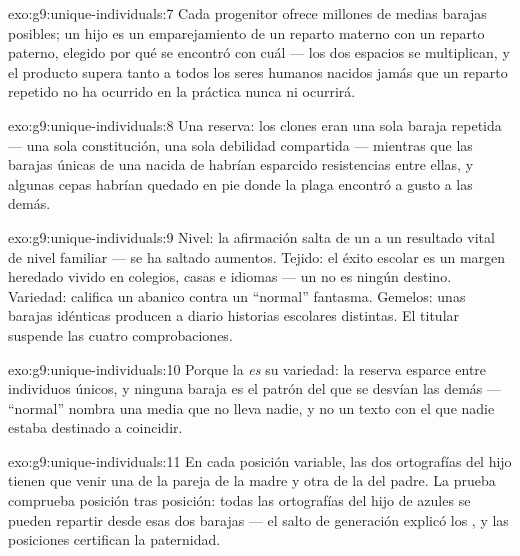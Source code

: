 \begin{solution}{exo:g9:unique-individuals:7}
Cada progenitor ofrece millones de medias barajas posibles; un hijo es
un emparejamiento de un reparto materno con un reparto paterno,
elegido por qué  se encontró con cuál --- los dos espacios se
multiplican, y el producto supera tanto a todos los seres humanos
nacidos jamás que un reparto repetido no ha ocurrido en la práctica
nunca ni ocurrirá.
\end{solution}

\begin{solution}{exo:g9:unique-individuals:8}
Una reserva: los clones eran una sola baraja repetida --- una sola
constitución, una sola debilidad compartida --- mientras que las
barajas únicas de una  nacida de  habrían esparcido
resistencias entre ellas, y algunas cepas habrían quedado en pie donde
la plaga encontró a gusto a las demás.
\end{solution}

\begin{solution}{exo:g9:unique-individuals:9}
Nivel: la afirmación salta de un  a un resultado vital de nivel
familiar --- se ha saltado aumentos. Tejido: el éxito escolar es un
margen heredado vivido en colegios, casas e idiomas --- un  no es
ningún destino. Variedad: califica un abanico contra un ``normal''
fantasma. Gemelos: unas barajas idénticas producen a diario historias
escolares distintas. El titular suspende las cuatro comprobaciones.
\end{solution}

\begin{solution}{exo:g9:unique-individuals:10}
Porque la  \emph{es} su variedad: la reserva esparce 
entre individuos únicos, y ninguna baraja es el patrón del que se
desvían las demás --- ``normal'' nombra una media que no lleva nadie, y
no un texto con el que nadie estaba destinado a coincidir.
\end{solution}

\begin{solution}{exo:g9:unique-individuals:11}
En cada posición variable, las dos ortografías del hijo tienen que
venir una de la pareja de la madre y otra de la del padre. La prueba
comprueba posición tras posición: todas las ortografías del hijo de
 azules se pueden repartir desde esas dos barajas --- el salto de
generación explicó los , y las posiciones certifican la paternidad.
\end{solution}

